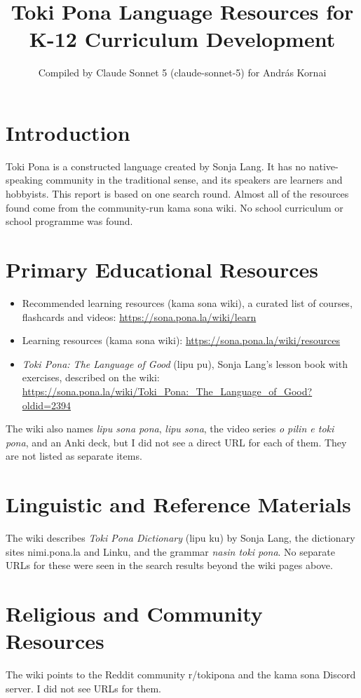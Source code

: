 \documentclass[12pt]{article}
\title{Toki Pona Language Resources for K-12 Curriculum Development}
\author{Compiled by Claude Sonnet 5 (claude-sonnet-5) for Andr\'as Kornai}
\date{}
\begin{document}
\maketitle

\section{Introduction}
Toki Pona is a constructed language created by Sonja Lang. It has no native-speaking community in the traditional sense, and its speakers are learners and hobbyists. This report is based on one search round. Almost all of the resources found come from the community-run kama sona wiki. No school curriculum or school programme was found.

\section{Primary Educational Resources}
\begin{itemize}
\item Recommended learning resources (kama sona wiki), a curated list of courses, flashcards and videos: \url{https://sona.pona.la/wiki/learn}
\item Learning resources (kama sona wiki): \url{https://sona.pona.la/wiki/resources}
\item \emph{Toki Pona: The Language of Good} (lipu pu), Sonja Lang's lesson book with exercises, described on the wiki: \url{https://sona.pona.la/wiki/Toki_Pona:_The_Language_of_Good?oldid=2394}
\end{itemize}
The wiki also names \emph{lipu sona pona}, \emph{lipu sona}, the video series \emph{o pilin e toki pona}, and an Anki deck, but I did not see a direct URL for each of them. They are not listed as separate items.

\section{Linguistic and Reference Materials}
The wiki describes \emph{Toki Pona Dictionary} (lipu ku) by Sonja Lang, the dictionary sites nimi.pona.la and Linku, and the grammar \emph{nasin toki pona}. No separate URLs for these were seen in the search results beyond the wiki pages above.

\section{Religious and Community Resources}
The wiki points to the Reddit community r/tokipona and the kama sona Discord server. I did not see URLs for them.
\end{document}
